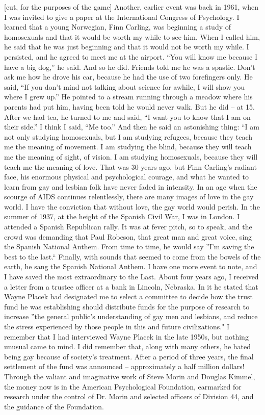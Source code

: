 [cut, for the purposes of the game]
Another, earlier event was back in 1961, when I was invited to give a paper at the International Congress of Psychology. I learned that a young Norwegian, Finn Carling, was beginning a study of homosexuals and that it would be worth my while to see him. When I called him, he said that he was just beginning and that it would not be worth my while. I persisted, and he agreed to meet me at the airport. ``You will know me because I have a big dog,'' he said. And so he did. Friends told me he was a spastic. Don't ask me how he drove his car, because he had the use of two forefingers only. He said, ``If you don't mind not talking about science for awhile, I will show you where I grew up.'' He pointed to a stream running through a meadow where his parents had put him, having been told he would never walk. But he did – at 15.
After we had tea, he turned to me and said, ``I want you to know that I am on their side.'' I think I said, ``Me too.'' And then he said an astonishing thing: ``I am not only studying homosexuals, but I am studying refugees, because they teach me the meaning of movement. I am studying the blind, because they will teach me the meaning of sight, of vision. I am studying homosexuals, because they will teach me the meaning of love.
That was 30 years ago, but Finn Carling's radiant face, his enormous physical and psychological courage, and what he wanted to learn from gay and lesbian folk have never faded in intensity. In an age when the scourge of AIDS continues relentlessly, there are many images of love in the gay world. I have the conviction that without love, the gay world would perish.
In the summer of 1937, at the height of the Spanish Civil War, I was in London. I attended a Spanish Republican rally. It was at fever pitch, so to speak, and the crowd was demanding that Paul Robeson, that great man and great voice, sing the Spanish National Anthem. From time to time, he would say ''I'm saving the best to the last.`` Finally, with sounds that seemed to come from the bowels of the earth, he sang the Spanish National Anthem.
I have one more event to note, and I have saved the most extraordinary to the Last. About four years ago, I received a letter from a trustee officer at a bank in Lincoln, Nebraska. In it he stated that Wayne Placek had designated me to select a committee to decide how the trust fund he was establishing should distribute funds for the purpose of research to increase ''the general public's understanding of gay men and lesbians, and reduce the stress experienced by those people in this and future civilizations." I remember that I had interviewed Wayne Placek in the late 1950s, but nothing unusual came to mind. I did remember that, along with many others, he hated being gay because of society's treatment.
After a period of three years, the final settlement of the fund was announced – approximately a half million dollars! Through the valiant and imaginative work of Steve Morin and Douglas Kimmel, the money now is in the American Psychological Foundation, earmarked for research under the control of Dr. Morin and selected officers of Division 44, and the guidance of the Foundation.

